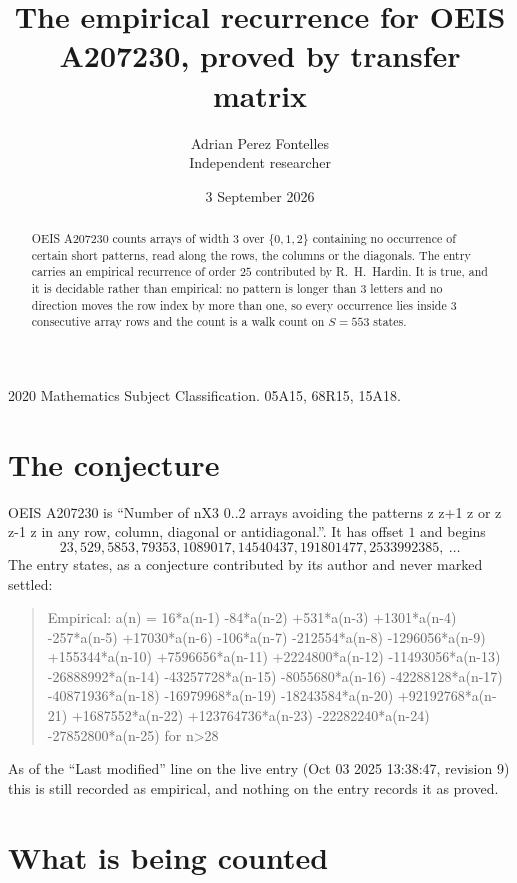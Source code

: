 \documentclass[11pt,a4paper]{article}
\title{The empirical recurrence for OEIS A207230, proved by transfer matrix}
\author{Adrian Perez Fontelles\\ \small Independent researcher}
\date{3 September 2026}
\theoremstyle{plain}
\theoremstyle{definition}
\begin{document}
\maketitle

\begin{abstract}
OEIS A207230 counts arrays of width $3$ over $\{0,1,2\}$ containing no occurrence of certain short
patterns, read along the rows, the columns or the diagonals. The entry carries an empirical
recurrence of order $25$ contributed by R.~H.~Hardin. It is true, and it is decidable
rather than empirical: no pattern is longer than $3$ letters and no direction moves the row
index by more than one, so every occurrence lies inside $3$ consecutive array rows and the
count is a walk count on $S=553$ states.
\end{abstract}

\noindent\small 2020 Mathematics Subject Classification. 05A15, 68R15, 15A18.\normalsize

\section{The conjecture}

OEIS A207230 is ``Number of nX3 0..2 arrays avoiding the patterns z z+1 z or z z-1 z in any row, column, diagonal or antidiagonal.''. It has offset $1$ and begins
\[
23, 529, 5853, 79353, 1089017, 14540437, 191801477, 2533992385,\ \dots
\]
The entry states, as a conjecture contributed by its author and never marked settled:
\begin{quote}
Empirical: a(n) = 16*a(n-1) -84*a(n-2) +531*a(n-3) +1301*a(n-4) -257*a(n-5) +17030*a(n-6) -106*a(n-7) -212554*a(n-8) -1296056*a(n-9) +155344*a(n-10) +7596656*a(n-11) +2224800*a(n-12) -11493056*a(n-13) -26888992*a(n-14) -43257728*a(n-15) -8055680*a(n-16) -42288128*a(n-17) -40871936*a(n-18) -16979968*a(n-19) -18243584*a(n-20) +92192768*a(n-21) +1687552*a(n-22) +123764736*a(n-23) -22282240*a(n-24) -27852800*a(n-25) for n>28
\end{quote}
As of the ``Last modified'' line on the live entry (Oct 03 2025 13:38:47, revision 9) this is still
recorded as empirical, and nothing on the entry records it as proved.

\section{What is being counted}
\end{document}
